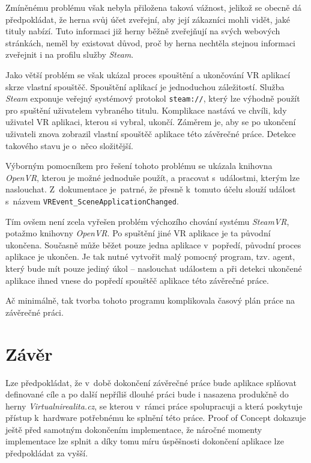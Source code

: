 \documentclass[12pt, a4paper]{article}
\begin{document}
Zmíněnému problému však nebyla přiložena taková vážnost, jelikož se obecně dá předpokládat, že herna svůj účet zveřejní, aby její zákazníci mohli vidět, jaké tituly nabízí. Tuto informaci již herny běžně zveřejňují na svých webových stránkách, neměl by existovat důvod, proč by herna nechtěla stejnou informaci zveřejnit i na profilu služby \textit{Steam}.

Jako větší problém se však ukázal proces spouštění a ukončování VR aplikací skrze vlastní spouštěč. Spouštění aplikací je jednoduchou záležitostí. Služba \textit{Steam} exponuje veřejný systémový protokol \texttt{steam://}, který lze výhodně použít pro spuštění uživatelem vybraného titulu.\cite{protocl}
Komplikace nastává ve chvíli, kdy uživatel VR aplikaci, kterou si vybral, ukončí. Záměrem je, aby se po ukončení uživateli znova zobrazil vlastní spouštěč aplikace této závěrečné práce. Detekce takového stavu je o~něco složitější.

Výborným pomocníkem pro řešení tohoto problému se ukázala knihovna \textit{OpenVR}, kterou je možné jednoduše použít, a pracovat s~událostmi, kterým lze naslouchat. Z~dokumentace je~patrné, že přesně k~tomuto účelu slouží událost s~názvem \texttt{VREvent\_SceneApplicationChanged}.\cite{openvrapi}

Tím ovšem není zcela vyřešen problém výchozího chování systému \textit{SteamVR}, potažmo knihovny \textit{OpenVR}. Po spuštění jiné VR aplikace je ta původní ukončena. Současně může běžet pouze jedna aplikace v~popředí, původní proces aplikace je ukončen. Je tak nutné vytvořit malý pomocný program, tzv. agent, který bude mít pouze jediný úkol -- naslouchat událostem a při detekci ukončené aplikace ihned vnese do popředí spouštěč aplikace této závěrečné práce.

Ač minimálně, tak tvorba tohoto programu komplikovala časový plán práce na závěrečné práci.

\section{Závěr}

Lze předpokládat, že v~době dokončení závěrečné práce bude aplikace splňovat definované cíle a po další nepříliš dlouhé práci bude i nasazena produkčně do herny \textit{Virtualnirealita.cz}, se kterou v~rámci práce spolupracuji a která poskytuje přístup k~hardware potřebnému ke splnění této práce. Proof of Concept dokazuje ještě před samotným dokončením implementace, že náročné momenty implementace lze splnit a díky tomu míru úspěšnosti dokončení aplikace lze předpokládat za vyšší.
\end{document}
